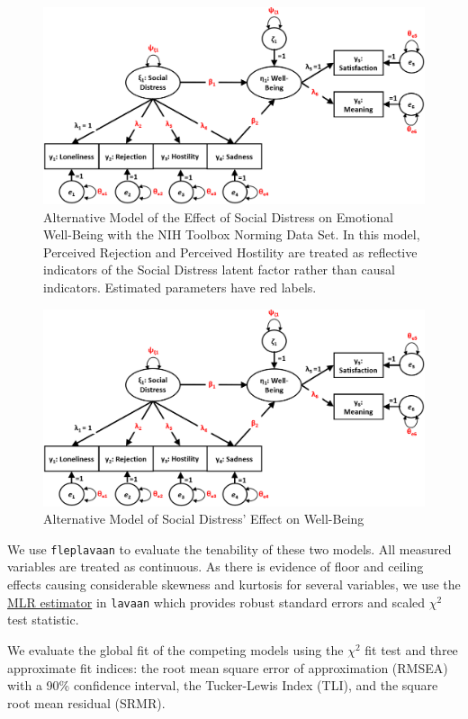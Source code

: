 \documentclass[
  english,
  doc]{apa6}
\begin{document}
\begin{figure}

{\centering \includegraphics[width=0.25\linewidth]{toolboxDiagramAlternative} 

}

\caption{Alternative Model of the Effect of Social Distress on Emotional Well-Being with the NIH Toolbox Norming Data Set. In this model, Perceived Rejection and Perceived Hostility are treated as reflective indicators of the Social Distress latent factor rather than causal indicators. Estimated parameters have red labels.}\label{fig:toolbox2}
\end{figure}

\begin{figure}
\centering
\includegraphics{images/toolboxDiagramAlternative.png}
\caption{Alternative Model of Social Distress' Effect on Well-Being\label{fig:alternativeToolbox}}
\end{figure}

We use \texttt{fleplavaan} to evaluate the tenability of these two models. All measured variables are treated as continuous. As there is evidence of floor and ceiling effects causing considerable skewness and kurtosis for several variables, we use the \href{http://https://lavaan.ugent.be/tutorial/est.html}{MLR estimator} in \texttt{lavaan} which provides robust standard errors and scaled \(\chi^2\) test statistic.

We evaluate the global fit of the competing models using the \(\chi^2\) fit test and three approximate fit indices: the root mean square error of approximation (RMSEA) with a 90\% confidence interval, the Tucker-Lewis Index (TLI), and the square root mean residual (SRMR).
\end{document}
